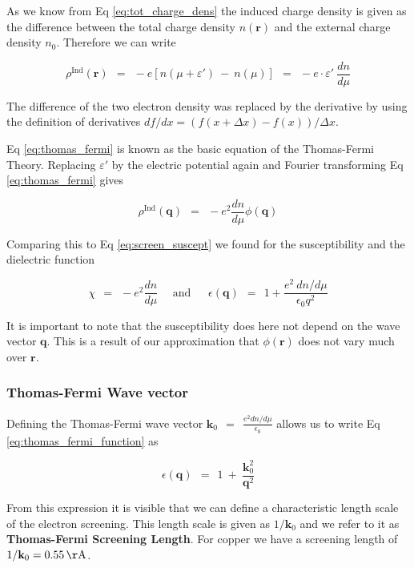\documentclass[10pt]{report}
\numberwithin{equation}{chapter}
\newcommand{\refEq}[1]{
  Eq  \ref{#1}
}
\begin{document}
As we know from \refEq{eq:tot_charge_dens} the induced charge density is given as the difference between the total charge density $n(\mathbf{r})$ and the external charge density $n_0$. Therefore we can write

\begin{equation} \label{eq:thomas_fermi}
  \rho^\text{Ind}(\mathbf{r}) ~~=~~ -e \left[ n(\mu + \varepsilon') ~-~ n(\mu) \right] 
  ~~=~~ -e \cdot \varepsilon'\ \frac{dn}{d\mu}
\end{equation}

The difference of the two electron density was replaced by the derivative by using the definition of derivatives $df/dx = (f(x+\Delta x) - f(x))/\Delta x$.
\refEq{eq:thomas_fermi} is known as the basic equation of the Thomas-Fermi Theory. Replacing $\varepsilon'$ by the electric potential again and Fourier transforming \refEq{eq:thomas_fermi} gives

\begin{equation}
  \rho^\text{Ind}(\mathbf{q}) ~~=~~ -e^2 \frac{dn}{d \mu} \phi(\mathbf{q})
\end{equation}

Comparing this to \refEq{eq:screen_suscept} we found for the susceptibility and the dielectric function

\begin{equation} \label{eq:thomas_fermi_function}
  \chi ~~=~~ -e^2 \frac{dn}{d \mu} ~~~~~~\text{and}~~~~~~~ 
  \epsilon(\mathbf{q}) ~~=~~ 1 + \frac{e^2\ dn/d\mu}{\epsilon_0 q^2}
\end{equation}

It is important to note that the susceptibility does here not depend on the wave vector $\mathbf{q}$. This is a result of our approximation that $\phi(\mathbf{r})$ does not vary much over $\mathbf{r}$.


\subsubsection{Thomas-Fermi Wave vector}

Defining the Thomas-Fermi wave vector $\mathbf{k}_0 ~~=~~ \frac{e^2 dn/d\mu}{\epsilon_0}$ allows us to write \refEq{eq:thomas_fermi_function} as 

\begin{equation} \label{eq:screening_dielect_new}
  \epsilon(\mathbf{q}) ~~=~~ 1 ~+~ \frac{\mathbf{k}_0^2}{\mathbf{q}^2}
\end{equation}

From this expression it is visible that we can define a characteristic length scale of the electron screening. This length scale is given as $1/\mathbf{k}_0$ and we refer to it as \textbf{Thomas-Fermi Screening Length}. For copper we have a screening length of $1/\mathbf{k}_0 = \SI{0.55}{\AA}$.
\end{document}

